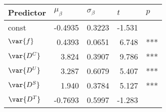 \begin{tabular}{l r r r r}
\toprule
  Predictor & \multicolumn{1}{l}{$\mu_{\beta}$} & \multicolumn{1}{l}{$\sigma_{\beta}$} & \multicolumn{1}{l}{$t$} & \multicolumn{1}{l}{$p$} \\ \midrule
const & -0.4935 & 0.3223 & -1.531 & ~ \\
$\var{f}$ & 0.4393 & 0.0651 & 6.748 & *** \\
$\var{D^{C}}$ & 3.824 & 0.3907 & 9.786 & *** \\
$\var{D^{U}}$ & 3.287 & 0.6079 & 5.407 & *** \\
$\var{D^{S}}$ & 1.940 & 0.3784 & 5.127 & *** \\
$\var{D^{T}}$ & -0.7693 & 0.5997 & -1.283 & ~ \\
\bottomrule
\end{tabular}
